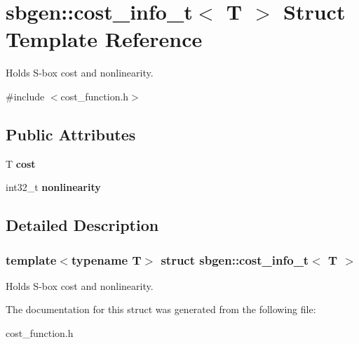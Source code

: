 \hypertarget{structsbgen_1_1cost__info__t}{}\section{sbgen\+:\+:cost\+\_\+info\+\_\+t$<$ T $>$ Struct Template Reference}
\label{structsbgen_1_1cost__info__t}


Holds S-\/box cost and nonlinearity.  




{\ttfamily \#include $<$cost\+\_\+function.\+h$>$}

\subsection*{Public Attributes}
\begin{DoxyCompactItemize}
\item 
\mbox{\label{structsbgen_1_1cost__info__t_a5b46af2515a3677ca992c2a98e6b1251}} 
T {\bfseries cost}
\item 
\mbox{\label{structsbgen_1_1cost__info__t_a81298de0a4a0d8553b1ba45c5c878ac8}} 
int32\+\_\+t {\bfseries nonlinearity}
\end{DoxyCompactItemize}


\subsection{Detailed Description}
\subsubsection*{template$<$typename T$>$\newline
struct sbgen\+::cost\+\_\+info\+\_\+t$<$ T $>$}

Holds S-\/box cost and nonlinearity. 

The documentation for this struct was generated from the following file\+:\begin{DoxyCompactItemize}
\item 
cost\+\_\+function.\+h\end{DoxyCompactItemize}
